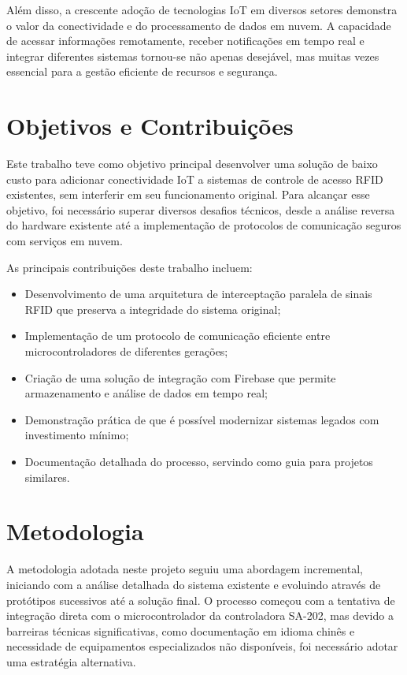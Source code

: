 Além disso, a crescente adoção de tecnologias IoT em diversos setores demonstra o valor da conectividade e do processamento de dados em nuvem. A capacidade de acessar informações remotamente, receber notificações em tempo real e integrar diferentes sistemas tornou-se não apenas desejável, mas muitas vezes essencial para a gestão eficiente de recursos e segurança.

\section{Objetivos e Contribuições}

Este trabalho teve como objetivo principal desenvolver uma solução de baixo custo para adicionar conectividade IoT a sistemas de controle de acesso RFID existentes, sem interferir em seu funcionamento original. Para alcançar esse objetivo, foi necessário superar diversos desafios técnicos, desde a análise reversa do hardware existente até a implementação de protocolos de comunicação seguros com serviços em nuvem.

As principais contribuições deste trabalho incluem:

\begin{itemize}
    \item Desenvolvimento de uma arquitetura de interceptação paralela de sinais RFID que preserva a integridade do sistema original;
    \item Implementação de um protocolo de comunicação eficiente entre microcontroladores de diferentes gerações;
    \item Criação de uma solução de integração com Firebase que permite armazenamento e análise de dados em tempo real;
    \item Demonstração prática de que é possível modernizar sistemas legados com investimento mínimo;
    \item Documentação detalhada do processo, servindo como guia para projetos similares.
\end{itemize}

\section{Metodologia}

A metodologia adotada neste projeto seguiu uma abordagem incremental, iniciando com a análise detalhada do sistema existente e evoluindo através de protótipos sucessivos até a solução final. O processo começou com a tentativa de integração direta com o microcontrolador da controladora SA-202, mas devido a barreiras técnicas significativas, como documentação em idioma chinês e necessidade de equipamentos especializados não disponíveis, foi necessário adotar uma estratégia alternativa.

